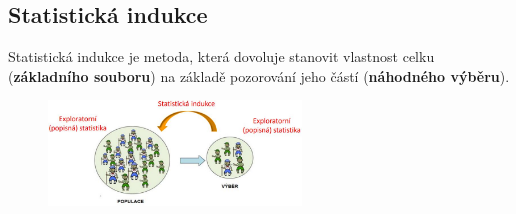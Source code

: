 
\subsection{Statistická indukce}
Statistická indukce je metoda, která dovoluje stanovit vlastnost celku (\textbf{základního souboru}) na základě pozorování jeho částí (\textbf{náhodného výběru}).
\begin{figure}[H]
\centering
\includegraphics[width=0.6\textwidth]{assets/14_stat_ind}
\end{figure}

